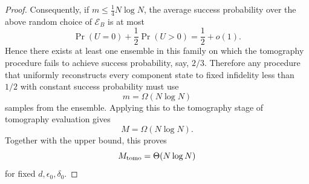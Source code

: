 \documentclass[aps,prx,reprint,superscriptaddress,amsmath,amssymb,longbibliography,floatfix]{revtex4-2}
\newcommand{\scE}{\mathcal{E}}
\theoremstyle{plain}
\theoremstyle{definition}
\theoremstyle{remark}
\begin{document}
\begin{proof}
Consequently, if \(m\le \frac14 N\log N\), the average success probability over
the above random choice of \(\scE_B\) is at most
\[
    \Pr(U=0)+\frac12\Pr(U>0)
    =
    \frac12+o(1).
\]
Hence there exists at least one ensemble in this family on which the tomography
procedure fails to achieve success probability, say, \(2/3\). Therefore any
procedure that uniformly reconstructs every component state to fixed infidelity
less than \(1/2\) with constant success probability must use
\[
    m=\Omega(N\log N)
\]
samples from the ensemble. Applying this to the tomography stage of tomography
evaluation gives
\[
    M=\Omega(N\log N).
\]
Together with the upper bound, this proves
\begin{equation}
    M_{\rm tomo}=\Theta(N\log N)
\label{eq:app-tomography-matching-complexity}
\end{equation}
for fixed \(d,\epsilon_0,\delta_0\).
\end{proof}
\end{document}
